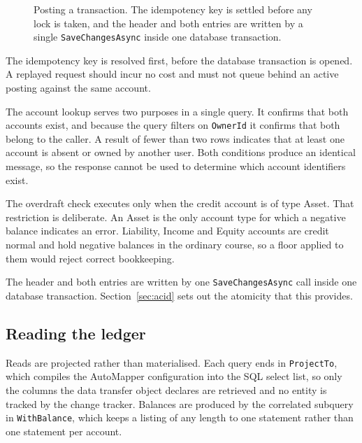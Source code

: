 \documentclass[11pt,a4paper]{article}
\newcommand{\msg}[4]{\draw[sqmsg] (#1,#3) -- (#2,#3) node[sqlab]{#4};}
\newcommand{\ret}[4]{\draw[sqret] (#1,#3) -- (#2,#3) node[sqlab]{#4};}
\newcommand{\selfmsg}[3]{%
  \draw[sqmsg] (#1,#2) -- (#1+0.38,#2) -- (#1+0.38,#2-0.3) -- (#1,#2-0.3);
  \node[sqfree,anchor=west] at (#1+0.48,#2-0.15) {#3};}
\newcommand{\code}[1]{\texttt{\fontsize{8.6}{10}\selectfont #1}}
\begin{document}
\begin{figure}[H]
\caption{Posting a transaction. The idempotency key is settled before any lock
is taken, and the header and both entries are written by a single
\texttt{SaveChangesAsync} inside one database transaction.}
\label{fig:post}
\end{figure}

The idempotency key is resolved first, before the database transaction is
opened. A replayed request should incur no cost and must not queue behind an
active posting against the same account.

The account lookup serves two purposes in a single query. It confirms that
both accounts exist, and because the query filters on \code{OwnerId} it
confirms that both belong to the caller. A result of fewer than two rows
indicates that at least one account is absent or owned by another user. Both
conditions produce an identical message, so the response cannot be used to
determine which account identifiers exist.

The overdraft check executes only when the credit account is of type Asset.
That restriction is deliberate. An Asset is the only account type for which a
negative balance indicates an error. Liability, Income and Equity accounts are
credit normal and hold negative balances in the ordinary course, so a floor
applied to them would reject correct bookkeeping.

The header and both entries are written by one \code{SaveChangesAsync} call
inside one database transaction. Section~\ref{sec:acid} sets out the atomicity
that this provides.

\subsection{Reading the ledger}

Reads are projected rather than materialised. Each query ends in
\code{ProjectTo}, which compiles the AutoMapper configuration into the SQL
select list, so only the columns the data transfer object declares are
retrieved and no entity is tracked by the change tracker. Balances are produced
by the correlated subquery in \code{WithBalance}, which keeps a listing of any
length to one statement rather than one statement per account.
\end{document}

